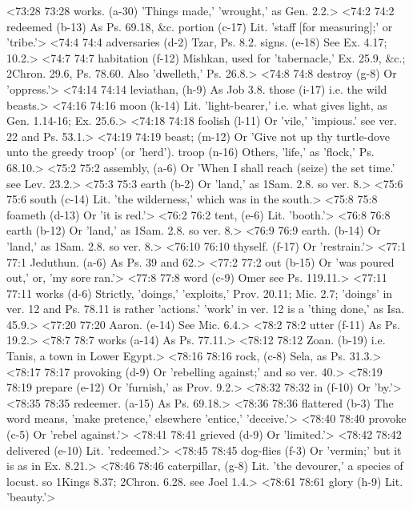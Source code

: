 <73:28 73:28  works. (a-30)  'Things made,' 'wrought,' as Gen. 2.2.>
<74:2 74:2  redeemed (b-13)  As Ps. 69.18, &c.
  portion (c-17)  Lit. 'staff [for measuring];' or 'tribe.'>
<74:4 74:4  adversaries (d-2)  Tzar, Ps. 8.2.
  signs. (e-18)  See Ex. 4.17; 10.2.>
<74:7 74:7  habitation (f-12)  Mishkan, used for 'tabernacle,' Ex. 25.9, &c.; 2Chron.  29.6, Ps. 78.60. Also 'dwelleth,' Ps. 26.8.>
<74:8 74:8  destroy (g-8)  Or 'oppress.'>
<74:14 74:14  leviathan, (h-9)  As Job 3.8.
  those (i-17)  i.e. the wild beasts.>
<74:16 74:16  moon (k-14)  Lit. 'light-bearer,' i.e. what gives light, as Gen. 1.14-16;  Ex. 25.6.>
<74:18 74:18  foolish (l-11)  Or 'vile,' 'impious.' see ver. 22 and Ps. 53.1.>
<74:19 74:19  beast; (m-12)  Or 'Give not up thy turtle-dove unto the greedy troop' (or  'herd').
  troop (n-16)  Others, 'life,' as 'flock,' Ps. 68.10.>
<75:2 75:2  assembly, (a-6)  Or 'When I shall reach (seize) the set time.' see Lev. 23.2.>
<75:3 75:3  earth (b-2) Or 'land,' as 1Sam. 2.8. so ver. 8.>
<75:6 75:6  south (c-14)  Lit. 'the wilderness,' which was in the south.>
<75:8 75:8  foameth (d-13)  Or 'it is red.'>
<76:2 76:2  tent, (e-6)  Lit. 'booth.'>
<76:8 76:8  earth (b-12) Or 'land,' as 1Sam. 2.8. so ver. 8.>
<76:9 76:9  earth. (b-14)  Or 'land,' as 1Sam. 2.8. so ver. 8.>
<76:10 76:10  thyself. (f-17)  Or 'restrain.'>
<77:1 77:1  Jeduthun. (a-6)  As Ps. 39 and 62.>
<77:2 77:2  out (b-15)  Or 'was poured out,' or, 'my sore ran.'>
<77:8 77:8  word (c-9)  Omer see Ps. 119.11.>
<77:11 77:11  works (d-6)  Strictly, 'doings,' 'exploits,' Prov. 20.11; Mic. 2.7;  'doings' in ver. 12 and Ps. 78.11 is rather 'actions.' 'work'  in ver. 12 is a 'thing done,' as Isa. 45.9.>
<77:20 77:20  Aaron. (e-14)  See Mic. 6.4.>
<78:2 78:2  utter (f-11)  As Ps. 19.2.>
<78:7 78:7  works (a-14)  As Ps. 77.11.>
<78:12 78:12  Zoan. (b-19)  i.e. Tanis, a town in Lower Egypt.>
<78:16 78:16  rock, (c-8)  Sela, as Ps. 31.3.>
<78:17 78:17  provoking (d-9)  Or 'rebelling against;' and so ver. 40.>
<78:19 78:19  prepare (e-12)  Or 'furnish,' as Prov. 9.2.>
<78:32 78:32  in (f-10)  Or 'by.'>
<78:35 78:35  redeemer. (a-15)  As Ps. 69.18.>
<78:36 78:36  flattered (b-3)  The word means, 'make pretence,' elsewhere 'entice,'  'deceive.'>
<78:40 78:40  provoke (c-5)  Or 'rebel against.'>
<78:41 78:41  grieved (d-9)  Or 'limited.'>
<78:42 78:42  delivered (e-10)  Lit. 'redeemed.'>
<78:45 78:45  dog-flies (f-3)  Or 'vermin;' but it is as in Ex. 8.21.>
<78:46 78:46  caterpillar, (g-8)  Lit. 'the devourer,' a species of locust. so 1Kings 8.37; 2Chron. 6.28. see Joel 1.4.>
<78:61 78:61  glory (h-9)  Lit. 'beauty.'>
